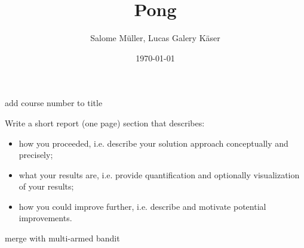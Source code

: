 \documentclass[10pt]{article}
\title{Pong}
\author{Salome Müller, Lucas Galery Käser}
\date{\today}
\newcommand{\todo}[1]{{\color{red}#1}}
\begin{document}
\maketitle

\todo{add course number to title}

\todo{
    Write a short report (one page) section that describes:
    \begin{itemize}
        \item how you proceeded, i.e. describe your solution approach conceptually and precisely;\\
        \item what your results are, i.e. provide quantification and optionally visualization of your results;\\
        \item how you could improve further, i.e. describe and motivate potential improvements.\\
    \end{itemize}

}

\todo{merge with multi-armed bandit}
\end{document}
